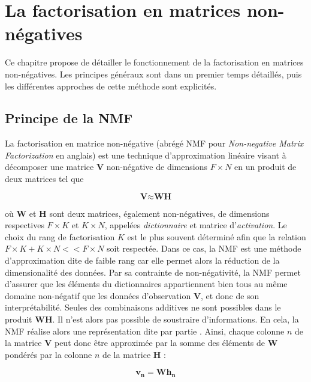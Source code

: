 %
%
%
%
%
\chapter{La factorisation en matrices non-négatives}
Ce chapitre propose de détailler le fonctionnement de la factorisation en matrices non-négatives. Les principes généraux sont dans un premier temps détaillés, puis les différentes approches de cette méthode sont explicités.

\section{Principe de la NMF}
La factorisation en matrice non-négative (abrégé NMF pour \textit{Non-negative Matrix Factorization} en anglais) est une technique d'approximation linéaire visant à décomposer une matrice $\textbf{V}$ non-négative de dimensions $F \times N$ en un produit de deux matrices tel que

\begin{equation}
\textbf{V} \approx \textbf{WH}
\end{equation}

où $\textbf{W}$ et $\textbf{H}$ sont deux matrices, également non-négatives, de dimensions respectives $F \times K$ et $K \times N$, appelées \textit{dictionnaire} et matrice d'\textit{activation}. Le choix du rang de factorisation $K$ est le plus souvent déterminé afin que la relation $F \times K + K \times N << F \times N$ soit respectée. Dans ce cas, la NMF est une méthode d'approximation dite de faible rang car elle permet alors la réduction de la dimensionalité des données. Par sa contrainte de non-négativité, la NMF permet d'assurer que les éléments du dictionnaires appartiennent bien tous au même domaine non-négatif que les données d'observation $\mathbf{V}$, et donc de son interprétabilité. Seules des combinaisons additives ne sont possibles dans le produit $\mathbf{WH}$. Il n'est alors pas possible de soustraire d'informations. En cela, la NMF réalise alors une représentation dite \og par partie \fg{}. Ainsi, chaque colonne $n$ de la matrice $\mathbf{V}$ peut donc être approximée par la somme des éléments de $\mathbf{W}$ pondérés par la colonne $n$ de la matrice $\mathbf{H}$ : 

\begin{equation}
\mathbf{v_n} = \mathbf{Wh_n}
\end{equation}


